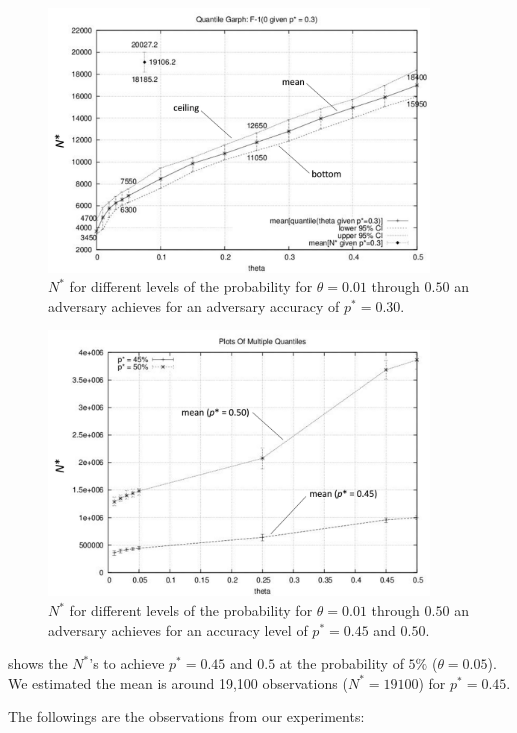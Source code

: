 \documentclass[ ../main.tex]{subfiles}
\begin{document}
\begin{figure}
\centering
\label{fig6}
\caption{$N^*$ for different levels of the probability for $\theta = 0.01$ through $0.50$ an adversary achieves for an adversary accuracy of $p^* = 0.30$.}
\includegraphics[width=0.9\textwidth]{images/fig6.png}
\end{figure}


\begin{figure}
\centering
\label{fig7}
\caption{$N^*$ for different levels of the probability for $\theta = 0.01$ through $0.50$ an adversary achieves for an accuracy level of $p^* = 0.45$ and $0.50$.}
\includegraphics[width=0.9\textwidth]{images/fig7.png}
\end{figure}

 shows the $N^*$'s to achieve $p^* = 0.45$ and $0.5$ at the probability of $5\%$ ($\theta = 0.05$). We estimated the mean is around 19,100 observations ($N^* = 19100$) for $p^* = 0.45$.

The followings are the observations from our experiments:
\end{document}

